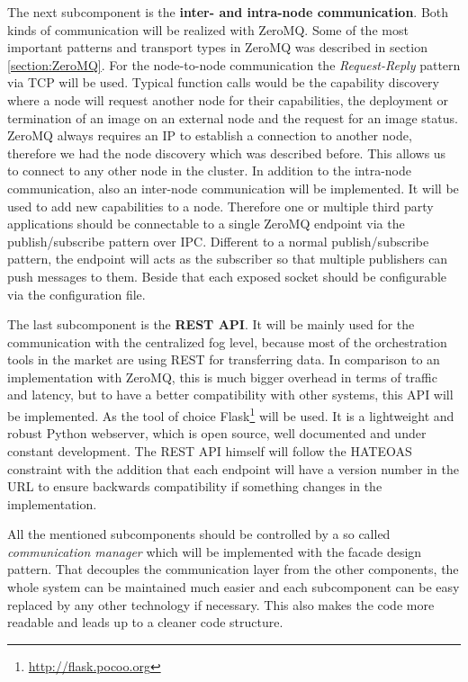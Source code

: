 The next subcomponent is the \textbf{inter- and intra-node communication}.
Both kinds of communication will be realized with ZeroMQ.
Some of the most important patterns and transport types in ZeroMQ was described in section \ref{section:ZeroMQ}.
For the node-to-node communication the \textit{Request-Reply} pattern via \ac{TCP} will be used.
Typical function calls would be the capability discovery where a node will request another node for their capabilities, the deployment or termination of an image on an external node and the request for an image status.
ZeroMQ always requires an \ac{IP} to establish a connection to another node, therefore we had the node discovery which was described before.
This allows us to connect to any other node in the cluster.
In addition to the intra-node communication, also an inter-node communication will be implemented.
It will be used to add new capabilities to a node.
Therefore one or multiple third party applications should be connectable to a single ZeroMQ endpoint via the publish/subscribe pattern over \ac{IPC}.
Different to a normal publish/subscribe pattern, the endpoint will acts as the subscriber so that multiple publishers can push messages to them.
Beside that each exposed socket should be configurable via the configuration file.

The last subcomponent is the \textbf{\ac{REST} \ac{API}}.
It will be mainly used for the communication with the centralized fog level, because most of the orchestration tools in the market are using \ac{REST} for transferring data.
In comparison to an implementation with ZeroMQ, this is much bigger overhead in terms of traffic and latency, but to have a better compatibility with other systems, this \ac{API} will be implemented.
As the tool of choice Flask\footnote{\url{http://flask.pocoo.org}} will be used.
It is a lightweight and robust Python webserver, which is open source, well documented and under constant development.
The \ac{REST} \ac{API} himself will follow the \ac{HATEOAS} constraint with the addition that each endpoint will have a version number in the \ac{URL} to ensure backwards compatibility if something changes in the implementation.

All the mentioned subcomponents should be controlled by a so called \textit{communication manager} which will be implemented with the facade design pattern.
That decouples the communication layer from the other components, the whole system can be maintained much easier and each subcomponent can be easy replaced by any other technology if necessary.
This also makes the code more readable and leads up to a cleaner code structure.


